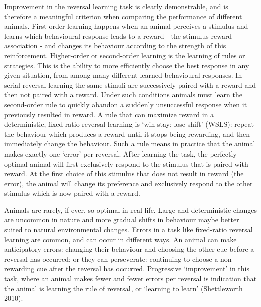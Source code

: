 \documentclass[
]{article}
\begin{document}
Improvement in the reversal learning task is clearly demonstrable, and is therefore a meaningful criterion when comparing the performance of different animals. First-order learning happens when an animal perceives a stimulus and learns which behavioural response leads to a reward - the stimulus-reward association - and changes its behaviour according to the strength of this reinforcement. Higher-order or second-order learning is the learning of rules or strategies. This is the ability to more efficiently choose the best response in any given situation, from among many different learned behavioural responses. In serial reversal learning the same stimuli are successively paired with a reward and then not paired with a reward. Under such conditions animals must learn the second-order rule to quickly abandon a suddenly unsuccessful response when it previously resulted in reward. A rule that can maximize reward in a deterministic, fixed ratio reversal learning is `win-stay; lose-shift' (WSLS): repeat the behaviour which produces a reward until it stops being rewarding, and then immediately change the behaviour. Such a rule means in practice that the animal makes exactly one `error' per reversal. After learning the task, the perfectly optimal animal will first exclusively respond to the stimulus that is paired with reward. At the first choice of this stimulus that does not result in reward (the error), the animal will change its preference and exclusively respond to the other stimulus which is now paired with a reward.

Animals are rarely, if ever, so optimal in real life. Large and deterministic changes are uncommon in nature and more gradual shifts in behaviour maybe better suited to natural environmental changes. Errors in a task like fixed-ratio reversal learning are common, and can occur in different ways. An animal can make anticipatory errors: changing their behaviour and choosing the other cue before a reversal has occurred; or they can perseverate: continuing to choose a non-rewarding cue after the reversal has occurred. Progressive `improvement' in this task, where an animal makes fewer and fewer errors per reversal is indication that the animal is learning the rule of reversal, or `learning to learn' (Shettleworth 2010).
\end{document}
